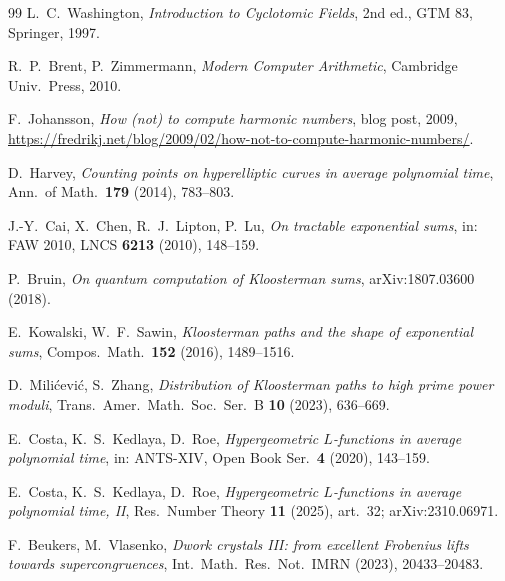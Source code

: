 \documentclass[11pt]{article}
\theoremstyle{remark}
\theoremstyle{definition}
\begin{document}
\begin{thebibliography}{99}
L.~C.~Washington,
\emph{Introduction to Cyclotomic Fields}, 2nd ed., GTM 83,
Springer, 1997.

R.~P.~Brent, P.~Zimmermann,
\emph{Modern Computer Arithmetic},
Cambridge Univ.\ Press, 2010.

F.~Johansson,
\emph{How (not) to compute harmonic numbers}, blog post, 2009,
\url{https://fredrikj.net/blog/2009/02/how-not-to-compute-harmonic-numbers/}.

D.~Harvey,
\emph{Counting points on hyperelliptic curves in average polynomial time},
Ann.\ of Math.\ \textbf{179} (2014), 783--803.

J.-Y.~Cai, X.~Chen, R.~J.~Lipton, P.~Lu,
\emph{On tractable exponential sums},
in: FAW 2010, LNCS \textbf{6213} (2010), 148--159.

P.~Bruin,
\emph{On quantum computation of Kloosterman sums},
arXiv:1807.03600 (2018).

E.~Kowalski, W.~F.~Sawin,
\emph{Kloosterman paths and the shape of exponential sums},
Compos.\ Math.\ \textbf{152} (2016), 1489--1516.

D.~Mili\'{c}evi\'{c}, S.~Zhang,
\emph{Distribution of Kloosterman paths to high prime power moduli},
Trans.\ Amer.\ Math.\ Soc.\ Ser.\ B \textbf{10} (2023), 636--669.

E.~Costa, K.~S.~Kedlaya, D.~Roe,
\emph{Hypergeometric $L$-functions in average polynomial time},
in: ANTS-XIV, Open Book Ser.\ \textbf{4} (2020), 143--159.

E.~Costa, K.~S.~Kedlaya, D.~Roe,
\emph{Hypergeometric $L$-functions in average polynomial time, II},
Res.\ Number Theory \textbf{11} (2025), art.\ 32; arXiv:2310.06971.

F.~Beukers, M.~Vlasenko,
\emph{Dwork crystals III: from excellent Frobenius lifts towards
supercongruences},
Int.\ Math.\ Res.\ Not.\ IMRN (2023), 20433--20483.

\end{thebibliography}
\end{document}
